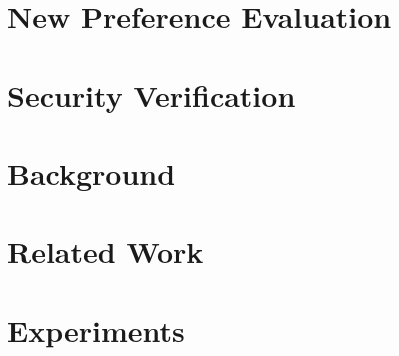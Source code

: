 \section{New Preference Evaluation}

\section{Security Verification}
\label{sec::safety}

\section{Background}

\section{Related Work}
\label{sec::related}


\section{Experiments}


